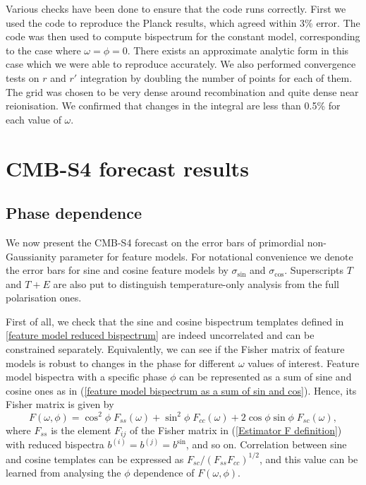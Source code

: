 Various checks have been done to ensure that the code runs correctly. First we used the code to reproduce the Planck results, which agreed within 3\% error. The code was then used to compute bispectrum for the constant model, corresponding to the case where $\omega=\phi=0$. There exists an approximate analytic form in this case \cite{Fergusson2012} which we were able to reproduce accurately. We also performed convergence tests on $r$ and $r'$ integration by doubling the number of points for each of them. The grid was chosen to be very dense around recombination and quite dense near reionisation. We confirmed that changes in the integral are less than 0.5\% for each value of $\omega$.


\section{CMB-S4 forecast results} \label{section: CMB-S4 forecast results}
\subsection{Phase dependence}

We now present the CMB-S4 forecast on the error bars of primordial non-Gaussianity parameter for feature models. For notational convenience we denote the error bars for sine and cosine feature models by $\sigma_{\sin}$ and $\sigma_{\cos}$. Superscripts $T$ and $T+E$ are also put to distinguish temperature-only analysis from the full polarisation ones.

First of all, we check that the sine and cosine bispectrum templates defined in \ref{feature model reduced bispectrum} are indeed uncorrelated and can be constrained separately. Equivalently, we can see if the Fisher matrix of feature models is robust to changes in the phase for different $\omega$ values of interest. Feature model bispectra with a specific phase $\phi$ can be represented as a sum of sine and cosine ones as in (\ref{feature model bispectrum as a sum of sin and cos}). Hence, its Fisher matrix is given by
\begin{equation}
	F(\omega, \phi) = \cos^2\phi \; F_{ss}(\omega) + \sin^2\phi \; F_{cc}(\omega) + 2\cos\phi\sin\phi \; F_{sc}(\omega),
\end{equation}
where $F_{ss}$ is the element $F_{ij}$ of the Fisher matrix in (\ref{Estimator F definition}) with reduced bispectra $b^{(i)} = b^{(j)} = b^{\sin}$, and so on. Correlation between sine and cosine templates can be expressed as $F_{sc}/(F_{ss}F_{cc})^{1/2}$, and this value can be learned from analysing the $\phi$ dependence of $F(\omega,\phi)$.

